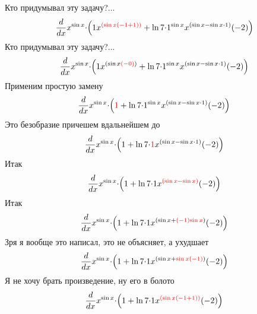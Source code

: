 \documentclass{article}
\begin{document}
\begin{center}
Кто придумывал эту задачу?...\begin{gather*}
{{\frac{{d}}{{d{{x}}}}}{{{{x}^{\sin{{x}}}}{\cdot}{\left({{1}{{x}^{\color{red}{{\left({\sin{{x}}}{\left({-{1}}+{1}\right)}\right)}}}}}+{{\ln{{7}}}{\cdot}{{{{1}^{\sin{{x}}}}{{x}^{\left({\sin{{x}}}-{{\sin{{x}}}{\cdot}{1}}\right)}}}{\left(-{2}\right)}}}\right)}}}}\end{gather*}
Кто придумывал эту задачу?...\begin{gather*}
{{\frac{{d}}{{d{{x}}}}}{{{{x}^{\sin{{x}}}}{\cdot}{\left({{1}{{x}^{\left({\sin{{x}}}{\color{red}{{\left(-{0}\right)}}}\right)}}}+{{\ln{{7}}}{\cdot}{{{{1}^{\sin{{x}}}}{{x}^{\left({\sin{{x}}}-{{\sin{{x}}}{\cdot}{1}}\right)}}}{\left(-{2}\right)}}}\right)}}}}\end{gather*}
Применим простую замену\begin{gather*}
{{\frac{{d}}{{d{{x}}}}}{{{{x}^{\sin{{x}}}}{\cdot}{\left({\color{red}{{1}}}+{{\ln{{7}}}{\cdot}{{{{1}^{\sin{{x}}}}{{x}^{\left({\sin{{x}}}-{{\sin{{x}}}{\cdot}{1}}\right)}}}{\left(-{2}\right)}}}\right)}}}}\end{gather*}
Это безобразие причешем вдальнейшем до\begin{gather*}
{{\frac{{d}}{{d{{x}}}}}{{{{x}^{\sin{{x}}}}{\cdot}{\left({1}+{{\ln{{7}}}{\cdot}{{\color{red}{{1}}}{{{x}^{\left({\sin{{x}}}-{{\sin{{x}}}{\cdot}{1}}\right)}}{\left(-{2}\right)}}}}\right)}}}}\end{gather*}
Итак\begin{gather*}
{{\frac{{d}}{{d{{x}}}}}{{{{x}^{\sin{{x}}}}{\cdot}{\left({1}+{{\ln{{7}}}{\cdot}{{1}{{{x}^{\color{red}{{\left({\sin{{x}}}-{\sin{{x}}}\right)}}}}{\left(-{2}\right)}}}}\right)}}}}\end{gather*}
Итак\begin{gather*}
{{\frac{{d}}{{d{{x}}}}}{{{{x}^{\sin{{x}}}}{\cdot}{\left({1}+{{\ln{{7}}}{\cdot}{{1}{{{x}^{\left({\sin{{x}}}+{\color{red}{{{\left(-{1}\right)}{\sin{{x}}}}}}\right)}}{\left(-{2}\right)}}}}\right)}}}}\end{gather*}
Зря я вообще это написал, это не объясняет, а ухудшает\begin{gather*}
{{\frac{{d}}{{d{{x}}}}}{{{{x}^{\sin{{x}}}}{\cdot}{\left({1}+{{\ln{{7}}}{\cdot}{{1}{{{x}^{\left({\sin{{x}}}+{\color{red}{{{\sin{{x}}}{\left(-{1}\right)}}}}\right)}}{\left(-{2}\right)}}}}\right)}}}}\end{gather*}
Я не хочу брать произведение, ну его в болото\begin{gather*}
{{\frac{{d}}{{d{{x}}}}}{{{{x}^{\sin{{x}}}}{\cdot}{\left({1}+{{\ln{{7}}}{\cdot}{{1}{{{x}^{\color{red}{{\left({\sin{{x}}}{\left({-{1}}+{1}\right)}\right)}}}}{\left(-{2}\right)}}}}\right)}}}}\end{gather*}

\end{center}
\end{document}
